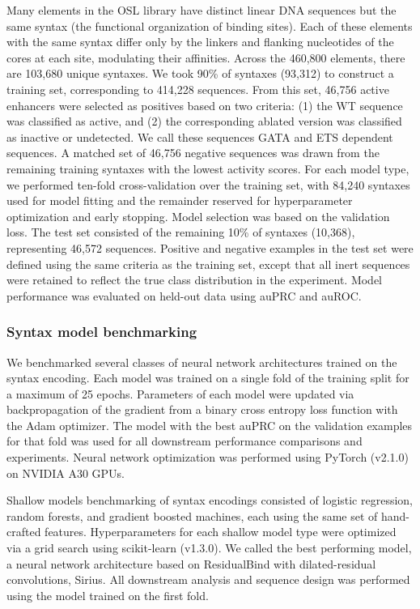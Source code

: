 Many elements in the OSL library have distinct linear DNA sequences but the same syntax (the functional organization of binding sites). Each of these elements with the same syntax differ only by the linkers and flanking nucleotides of the cores at each site, modulating their affinities. Across the 460,800 elements, there are 103,680 unique syntaxes. We took 90\% of syntaxes (93,312) to construct a training set, corresponding to 414,228 sequences. From this set, 46,756 active enhancers were selected as positives based on two criteria: (1) the WT sequence was classified as active, and (2) the corresponding ablated version was classified as inactive or undetected. We call these sequences GATA and ETS dependent sequences. A matched set of 46,756 negative sequences was drawn from the remaining training syntaxes with the lowest activity scores. For each model type, we performed ten-fold cross-validation over the training set, with 84,240 syntaxes used for model fitting and the remainder reserved for hyperparameter optimization and early stopping. Model selection was based on the validation loss. The test set consisted of the remaining 10\% of syntaxes (10,368), representing 46,572 sequences. Positive and negative examples in the test set were defined using the same criteria as the training set, except that all inert sequences were retained to reflect the true class distribution in the experiment. Model performance was evaluated on held-out data using auPRC and auROC.

\subsubsection{Syntax model benchmarking}

We benchmarked several classes of neural network architectures trained on the syntax encoding. Each model was trained on a single fold of the training split for a maximum of 25 epochs. Parameters of each model were updated via backpropagation of the gradient from a binary cross entropy loss function with the Adam optimizer\cite{Kingma2014-kn}. The model with the best auPRC on the validation examples for that fold was used for all downstream performance comparisons and experiments. Neural network optimization was performed using PyTorch (v2.1.0) on NVIDIA A30 GPUs.

Shallow models benchmarking of syntax encodings consisted of logistic regression, random forests, and gradient boosted machines, each using the same set of hand-crafted features. Hyperparameters for each shallow model type were optimized via a grid search using scikit-learn (v1.3.0). We called the best performing model, a neural network architecture based on ResidualBind\cite{Koo2021-ly} with dilated-residual convolutions, Sirius. All downstream analysis and sequence design was performed using the model trained on the first fold.

